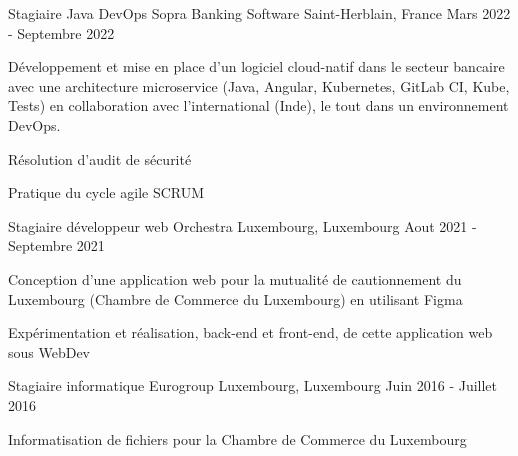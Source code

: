 
\begin{cventries}
  \cventry
    {Stagiaire Java DevOps} %
    {Sopra Banking Software} %
    {Saint-Herblain, France} %
    {Mars 2022 - Septembre 2022} %
    {
      \begin{cvitems} %
        \item {Développement et mise en place d'un logiciel cloud-natif dans le secteur bancaire avec une architecture microservice (Java, Angular, Kubernetes, GitLab CI, Kube, Tests) en collaboration avec l'international (Inde), le tout dans un environnement DevOps.}
        \item {Résolution d'audit de sécurité}
        \item {Pratique du cycle agile SCRUM}
      \end{cvitems}
    }
    
  \cventry
    {Stagiaire développeur web} %
    {Orchestra} %
    {Luxembourg, Luxembourg} %
    {Aout 2021 - Septembre 2021} %
    {
      \begin{cvitems} %
        \item {Conception d'une application web pour la mutualité de cautionnement du Luxembourg (Chambre de Commerce du Luxembourg) en utilisant Figma}
        \item {Expérimentation et réalisation, back-end et front-end, de cette application web sous WebDev}
      \end{cvitems}
    }

  \cventry
    {Stagiaire informatique} %
    {Eurogroup} %
    {Luxembourg, Luxembourg} %
    {Juin 2016 - Juillet 2016} %
    {
      \begin{cvitems} %
        \item {Informatisation de fichiers pour la Chambre de Commerce du Luxembourg}
      \end{cvitems}
    }

\end{cventries}
